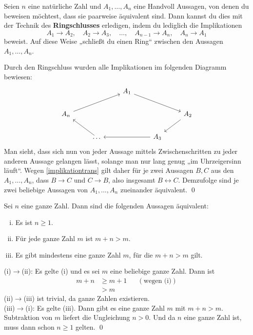 \begin{satz}[Ringschluss] \label{ringschluss} 
    Seien $n$ eine natürliche Zahl und $A_1,\dots , A_n$ eine Handvoll Aussagen, von denen du beweisen möchtest, dass sie paarweise äquivalent sind. Dann kannst du dies mit der Technik des \textbf{Ringschlusses} erledigen, indem du lediglich die Implikationen
        \[ A_1\to A_2,\quad A_2\to A_3,\quad \dots ,\quad A_{n-1}\to A_n,\quad A_n\to A_1 \]
    beweist. Auf diese Weise „schließt du einen Ring“ zwischen den Aussagen $A_1,\dots , A_n$.
\end{satz}


\begin{bew}
    Durch den Ringschluss wurden alle Implikationen im folgenden Diagramm bewiesen:
    \[\begin{tikzcd}
        &&& A_1 \ar[rrd] &&& \\
        &A_n\ar[rru]&&&& A_2 \ar[ld]& \\
        && \dots \ar[lu] && A_3 \ar[ll]&& 
    \end{tikzcd} \]
    Man sieht, dass sich nun von jeder Aussage mittels Zwischenschritten zu jeder anderen Aussage gelangen lässt, solange man nur lang genug „im Uhrzeigersinn läuft“. Wegen \cref{implikationtrans} gilt daher für je zwei Aussagen $B,C$ aus den $A_1,\dots , A_n$, dass $B\to C$ und $C\to B$, also insgesamt $B\leftrightarrow C$. Demzufolge sind je zwei beliebige Aussagen von $A_1,\dots , A_n$ zueinander äquivalent. \qed
\end{bew}


\begin{bsp} \label{bsp:ringschluss}
    Sei $n$ eine ganze Zahl. Dann sind die folgenden Aussagen äquivalent:
    \begin{enumerate}[(i)]
        \item Es ist $n\ge 1$.
        \item Für jede ganze Zahl $m$ ist $m+n>m$.
        \item Es gibt mindestens eine ganze Zahl $m$, für die $m+n>m$ gilt.
    \end{enumerate}
\end{bsp}


\begin{bew}
    (i)$\to$(ii): Es gelte (i) und es sei $m$ eine beliebige ganze Zahl. Dann ist
    \begin{align*}
        m+n & \ge m+1 && (\text{wegen (i)}) \\
        & > m
    \end{align*}
    (ii)$\to$(iii) ist trivial, da ganze Zahlen existieren. \\[0.5em]
    (iii)$\to$(i): Es gelte (iii). Dann gibt es eine ganze Zahl $m$ mit $m+n>m$. Subtraktion von $m$ liefert die Ungleichung $n>0$. Und da $n$ eine ganze Zahl ist, muss dann schon $n\ge 1$ gelten. \qed
\end{bew}


